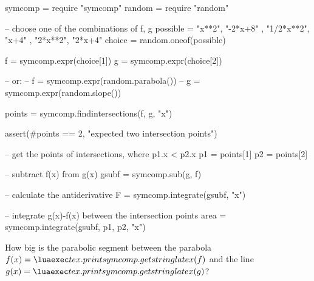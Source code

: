 \begin{luacode*}
    symcomp = require "symcomp"
    random = require "random"

    -- choose one of the combinations of { f, g }
    possible = { { "x**2", "-2*x+8" }, { "1/2*x**2", "x+4" }, { "2*x**2", "2*x+4" } }
    choice = random.oneof(possible)

    f = symcomp.expr(choice[1])
    g = symcomp.expr(choice[2])

    -- or:
    -- f = symcomp.expr(random.parabola())
    -- g = symcomp.expr(random.slope())

    points = symcomp.findintersections(f, g, "x")

    assert(#points == 2, "expected two intersection points")

    -- get the points of intersections, where p1.x < p2.x
    p1 = points[1]
    p2 = points[2]

    -- subtract f(x) from g(x)
    gsubf = symcomp.sub(g, f)
    
    -- calculate the antiderivative
    F = symcomp.integrate(gsubf, "x")

    -- integrate g(x)-f(x) between the intersection points
    area = symcomp.integrate(gsubf, p1, p2, "x")
\end{luacode*}

\question[k]
How big is the parabolic segment between the parabola $f(x)=\scprint{f}$ and the line $g(x)=\scprint{g}$?

